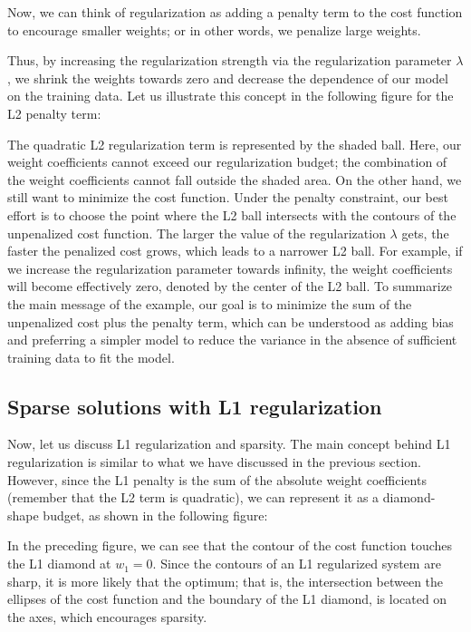 \documentclass[11pt]{article}
\begin{document}
    Now, we can think of regularization as adding a penalty term to the cost
function to encourage smaller weights; or in other words, we penalize
large weights.

Thus, by increasing the regularization strength via the regularization
parameter \(\lambda\), we shrink the weights towards zero and decrease
the dependence of our model on the training data. Let us illustrate this
concept in the following figure for the L2 penalty term:

    The quadratic L2 regularization term is represented by the shaded ball.
Here, our weight coefficients cannot exceed our regularization budget;
the combination of the weight coefficients cannot fall outside the
shaded area. On the other hand, we still want to minimize the cost
function. Under the penalty constraint, our best effort is to choose the
point where the L2 ball intersects with the contours of the unpenalized
cost function. The larger the value of the regularization \(\lambda\)
gets, the faster the penalized cost grows, which leads to a narrower L2
ball. For example, if we increase the regularization parameter towards
infinity, the weight coefficients will become effectively zero, denoted
by the center of the L2 ball. To summarize the main message of the
example, our goal is to minimize the sum of the unpenalized cost plus
the penalty term, which can be understood as adding bias and preferring
a simpler model to reduce the variance in the absence of sufficient
training data to fit the model.

    \subsection{Sparse solutions with L1
regularization}\label{sparse-solutions-with-l1-regularization}

    Now, let us discuss L1 regularization and sparsity. The main concept
behind L1 regularization is similar to what we have discussed in the
previous section. However, since the L1 penalty is the sum of the
absolute weight coefficients (remember that the L2 term is quadratic),
we can represent it as a diamond-shape budget, as shown in the following
figure:

    In the preceding figure, we can see that the contour of the cost
function touches the L1 diamond at \(w_1=0\). Since the contours of an
L1 regularized system are sharp, it is more likely that the optimum;
that is, the intersection between the ellipses of the cost function and
the boundary of the L1 diamond, is located on the axes, which encourages
sparsity.
\end{document}
